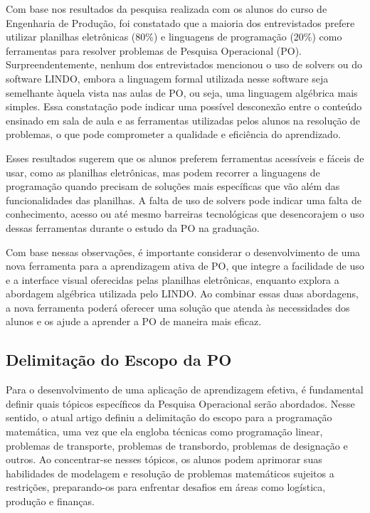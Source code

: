 \documentclass{article}
\begin{document}
Com base nos resultados da pesquisa realizada com os alunos do curso de Engenharia de Produção, foi constatado que a maioria dos entrevistados prefere utilizar planilhas eletrônicas (80\%) e linguagens de programação (20\%) como ferramentas para resolver problemas de Pesquisa Operacional (PO). Surpreendentemente, nenhum dos entrevistados mencionou o uso de solvers ou do software LINDO, embora a linguagem formal utilizada nesse software seja semelhante àquela vista nas aulas de PO, ou seja, uma linguagem algébrica mais simples. Essa constatação pode indicar uma possível desconexão entre o conteúdo ensinado em sala de aula e as ferramentas utilizadas pelos alunos na resolução de problemas, o que pode comprometer a qualidade e eficiência do aprendizado.

Esses resultados sugerem que os alunos preferem ferramentas acessíveis e fáceis de usar, como as planilhas eletrônicas, mas podem recorrer a linguagens de programação quando precisam de soluções mais específicas que vão além das funcionalidades das planilhas. A falta de uso de solvers pode indicar uma falta de conhecimento, acesso ou até mesmo barreiras tecnológicas que desencorajem o uso dessas ferramentas durante o estudo da PO na graduação.

Com base nessas observações, é importante considerar o desenvolvimento de uma nova ferramenta para a aprendizagem ativa de PO, que integre a facilidade de uso e a interface visual oferecidas pelas planilhas eletrônicas, enquanto explora a abordagem algébrica utilizada pelo LINDO. Ao combinar essas duas abordagens, a nova ferramenta poderá oferecer uma solução que atenda às necessidades dos alunos e os ajude a aprender a PO de maneira mais eficaz.

\subsection{Delimitação do Escopo da PO}

Para o desenvolvimento de uma aplicação de aprendizagem efetiva, é fundamental definir quais tópicos específicos da Pesquisa Operacional serão abordados. Nesse sentido, o atual artigo definiu a delimitação do escopo para a programação matemática, uma vez que ela engloba técnicas como programação linear, problemas de transporte, problemas de transbordo, problemas de designação e outros. Ao concentrar-se nesses tópicos, os alunos podem aprimorar suas habilidades de modelagem e resolução de problemas matemáticos sujeitos a restrições, preparando-os para enfrentar desafios em áreas como logística, produção e finanças.
\end{document}
